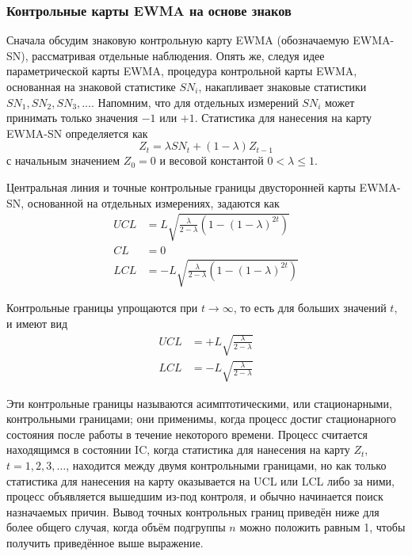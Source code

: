 \subsubsection{Контрольные карты EWMA на основе знаков}
Сначала обсудим знаковую контрольную карту EWMA (обозначаемую EWMA-SN), рассматривая отдельные наблюдения. Опять же, следуя идее параметрической карты EWMA, процедура контрольной карты EWMA, основанная на знаковой статистике \(SN_i\), накапливает знаковые статистики \(SN_1, SN_2, SN_3, \ldots\). Напомним, что для отдельных измерений \(SN_i\) может принимать только значения \(-1\) или \(+1\). Статистика для нанесения на карту EWMA-SN определяется как
\begin{equation}
	Z_t = \lambda SN_t + (1 - \lambda) Z_{t-1}
	\label{eq:4.13}
\end{equation}
с начальным значением \(Z_0 = 0\) и весовой константой \(0 < \lambda \le 1\).

Центральная линия и точные контрольные границы двусторонней карты EWMA-SN, основанной на отдельных измерениях, задаются как
\begin{equation}
	\begin{aligned}
		UCL &= L\sqrt{\frac{\lambda}{2 - \lambda} \left(1 - (1 - \lambda)^{2t}\right)} \\
		CL &= 0 \\
		LCL &= -L\sqrt{\frac{\lambda}{2 - \lambda} \left(1 - (1 - \lambda)^{2t}\right)}
	\end{aligned}
	\label{eq:4.14}
\end{equation}

Контрольные границы упрощаются при \(t \to \infty\), то есть для больших значений \(t\), и имеют вид
\begin{equation}
	\begin{aligned}
		UCL &= +L\sqrt{\frac{\lambda}{2 - \lambda}} \\
		LCL &= -L\sqrt{\frac{\lambda}{2 - \lambda}}
	\end{aligned}
	\label{eq:4.15}
\end{equation}

Эти контрольные границы называются асимптотическими, или стационарными, контрольными границами; они применимы, когда процесс достиг стационарного состояния после работы в течение некоторого времени. Процесс считается находящимся в состоянии IC, когда статистика для нанесения на карту \(Z_t\), \(t = 1, 2, 3, \ldots\), находится между двумя контрольными границами, но как только статистика для нанесения на карту оказывается на UCL или LCL либо за ними, процесс объявляется вышедшим из-под контроля, и обычно начинается поиск назначаемых причин. Вывод точных контрольных границ приведён ниже для более общего случая, когда объём подгруппы \(n\) можно положить равным 1, чтобы получить приведённое выше выражение.

